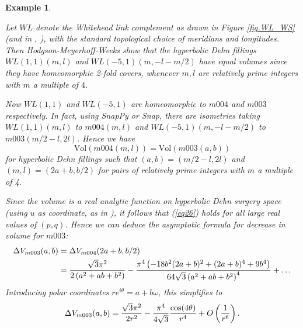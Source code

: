 \documentclass[reqno]{amsproc}  %
\newtheorem{ex}[prop]{\bf Example}
\def\vol{\text{Vol} }
\begin{document}
\begin{ex} \label{m003_NZ4}
{\em 
 Let $WL$ denote the Whitehead link complement 
as drawn in Figure \ref{fig.WL_WS} (and in \cite{HMW}, \cite{NR}),
with the standard topological choice of meridians and longitudes.
Then  Hodgson-Meyerhoff-Weeks  \cite[ Figure 8 with $p=q=1$]{HMW} show that 
the hyperbolic Dehn fillings $WL(1,1)(m,l)$ and $WL(-5,1)(m,-l-m/2)$
have equal volumes since they have homeomorphic 2-fold covers,
whenever $m,l$ are relatively prime integers with $m$ a multiple of $4$.

Now $WL(1,1)$ and $WL(-5,1)$ are homeomorphic to $m004$ and $m003$
respectively. In fact, using SnapPy or Snap,  there are isometries taking
$WL(1,1)(m,l)$ to $m004(m,l)$
and $WL(-5,1)(m,-l-m/2)$ to $m003(m/2-l,2l)$.
Hence we have
\begin{equation}  \label{eq26}\vol(m004(m,l)) =  \vol(m003(a,b))  
\end{equation} 
for hyperbolic Dehn fillings such that $(a,b)=(m/2-l,2l)$ and $(m,l)=(2a+b,b/2)$ for 
pairs of relatively prime integers 
with $m$ a multiple of 4. 
 
 \smallskip
 Since the volume is a real analytic function on hyperbolic Dehn surgery space
(using $u$ as coordinate, as in \cite{NZ}),
it follows that (\ref{eq26}) holds for all large real values of $(p,q)$. Hence we can
deduce the asymptotic formula for decrease in volume for $m003$:
\begin{align}\label{eq27}
\Delta V_{m003}(a,b) &= \Delta V_{m004}(2a+b,b/2) \notag\\
&=  \frac{\sqrt{3} \pi ^2}{2 \left(a^2+a b+b^2\right)}
-\frac{\pi ^4 \left(-18 b^2 (2 a+b)^2+(2 a+b)^4+9 b^4\right)}{64 \sqrt{3} \left(a^2+a
   b+b^2\right)^4}
 + \ldots
 \end{align}
Introducing polar coordinates 
$r e^{i \theta} =  a+ b \omega$,
this simplifies to
\begin{equation}  \label{eq28}
\Delta V_{m003}(a,b) =   { \sqrt{3} \pi^2 \over 2 r^2} - { \pi^4 \over 4 \sqrt{3}}{ \cos(4\theta) \over r^4} + 
O\left({1 \over r^6}\right).
\end{equation} 
}
\end{ex}
\end{document}
